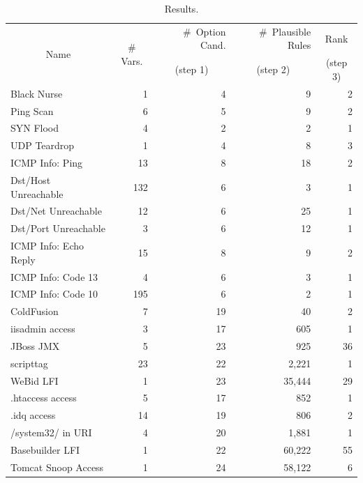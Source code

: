 \documentclass[conference]{IEEEtran}
\begin{document}
\begin{table}[t!]
  \footnotesize
  \setlength{\tabcolsep}{2pt}
  \renewcommand{\arraystretch}{0.7}
  \caption{\label{table:results}Results.}
  \vspace{-2ex}
  \centering
  \begin{tabular}{lrrrr}
    \toprule
    \multicolumn{1}{c}{\multirow{2}{*}{Name}} &
    \multicolumn{1}{c}{\multirow{2}{*}{\# Vars.}} &
    \#~Option Cand. &
    \#~Plausible Rules &    
    \multicolumn{1}{c}{Rank} \\

     &
    \multicolumn{1}{c}{} &
    \multicolumn{1}{c}{(step 1)} &
    \multicolumn{1}{c}{(step 2)} &    
    \multicolumn{1}{c}{(step 3)} \\

    \midrule
    Black Nurse & 1 & 4 & 9 & 2 \\    
    Ping Scan & 6 & 5 & 9 & 2 \\
    SYN Flood & 4 & 2 & 2 & 1 \\
    UDP Teardrop & 1 & 4 & 8 & 3 \\
    ICMP Info: Ping & 13 & 8 & 18 & 2 \\
    Dst/Host Unreachable & 132 & 6 & 3 & 1 \\
    Dst/Net Unreachable & 12 & 6 & 25 & 1 \\
    Dst/Port Unreachable & 3 & 6 & 12 & 1 \\
    ICMP Info: Echo Reply & 15 & 8 & 9 & 2 \\
    ICMP Info: Code 13 & 4 & 6 & 3 & 1 \\
    ICMP Info: Code 10 & 195 & 6 & 2 & 1 \\
    \midrule
    ColdFusion & 7 & 19 & 40 & 2\\
    iisadmin access & 3 & 17 & 605 & 1 \\        
    JBoss JMX & 5 & 23 & 925 & 36 \\
    scripttag & 23 & 22 & 2,221 & 1 \\
    WeBid LFI & 1 & 23 & 35,444 & 29\\    
    .htaccess access & 5 & 17 & 852 & 1\\
    .idq access & 14 & 19 & 806 & 2 \\
    /system32/ in URI & 4 & 20 & 1,881 & 1 \\
    Basebuilder LFI & 1 & 22 & 60,222 & 55 \\
    Tomcat Snoop Access & 1 & 24 & 58,122 & 6 \\
    \bottomrule
  \end{tabular}
\end{table}
\end{document}
